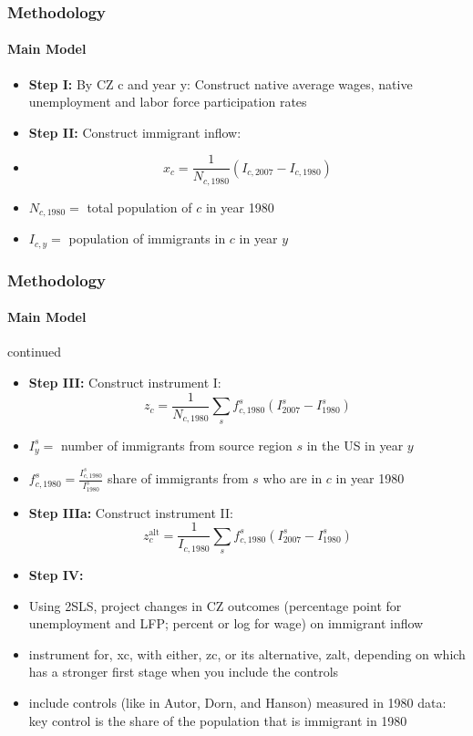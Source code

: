 \begin{frame}
    \frametitle{Methodology}
    \framesubtitle{Main Model}
    \begin{itemize}
        \item \textbf{Step I:} By CZ c and year y: Construct native average wages, native unemployment and labor force participation rates
    \end{itemize}
    \begin{itemize}
        \item \textbf{Step II:} Construct immigrant inflow: 
        \item \[x_c = \frac{1}{N_{c,1980}} \left(I_{c,2007} - I_{c,1980}\right)\]
    \end{itemize}
    \begin{itemize}
        \item $N_{c,1980} = $ total population of $c$ in year 1980
        \item $I_{c,y} = $ population of immigrants in $c$ in year $y$
    \end{itemize}
\end{frame}
\begin{frame}
    \frametitle{Methodology}
    \framesubtitle{Main Model} continued
    \begin{itemize}
        \item \textbf{Step III:} Construct instrument I:
        \[z_c = \frac{1}{N_{c,1980}} \sum_s f^s_{c,1980} \left(I^s_{2007} - I^s_{1980}\right)\]
    \end{itemize}
    \begin{itemize}
        \item $I^s_y = $ number of immigrants from source region $s$ in the US in year $y$
        \item $f^s_{c,1980} = \frac{I^s_{c,1980}}{I^s_{1980}}$ share of immigrants from $s$ who are in $c$ in year 1980
    \end{itemize}
    \begin{itemize}
        \item \textbf{Step IIIa:} Construct instrument II:
        \[z_c^{\text{alt}} = \frac{1}{I_{c,1980}} \sum_s f^s_{c,1980} \left(I^s_{2007} - I^s_{1980}\right)\]
    \end{itemize}
    \begin{itemize}
        \item \textbf{Step IV:} 
        \item Using 2SLS, project changes in CZ outcomes (percentage point for unemployment and LFP; percent or log for wage) on immigrant inflow
        \item instrument for, xc, with either, zc, or its alternative, zalt, depending on which has a
        stronger first stage when you include the controls
        \item include controls (like in Autor, Dorn, and Hanson) measured in 1980 data: key control is the share of the population that is immigrant in 1980
        \end{itemize}
\end{frame}


